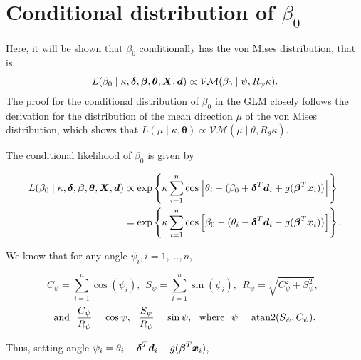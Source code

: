 
\section{Conditional distribution of $\beta_0$} \label{beta0}

Here, it will be shown that $\beta_0$ conditionally has the von Mises distribution, that is
\begin{equation}
L(\beta_0 \mid \kappa, \boldsymbol{\delta}, \boldsymbol{\beta}, \boldsymbol{\theta}, \boldsymbol{X}, \boldsymbol{d})  \propto \mathcal{VM}(\beta_0 \mid \bar\psi, R_{\psi}\kappa).
\end{equation} %
The proof for the conditional distribution of $\beta_0$ in the GLM closely follows the derivation for the distribution of the mean direction $\mu$ of the von Mises distribution, which shows that $L(\mu \mid \kappa, \boldsymbol\theta) \propto \mathcal{VM}(\mu \mid \bar\theta, R_{\theta} \kappa)$.

The conditional likelihood of $\beta_0$ is given by

\begin{align*}
L(\beta_0 \mid \kappa, \boldsymbol{\delta}, \boldsymbol{\beta}, \boldsymbol{\theta}, \boldsymbol{X}, \boldsymbol{d}) & \propto \exp \left\lbrace \kappa \sum_{i=1}^n \cos \left[ \theta_i - (\beta_0 + \boldsymbol{\delta}^T \boldsymbol{d}_i +  g(\boldsymbol\beta^T \boldsymbol{x}_i)) \right] \right\rbrace \\
& = \exp \left\lbrace \kappa \sum_{i=1}^n \cos \left[ \beta_0 - (\theta_i - \boldsymbol{\delta}^T \boldsymbol{d}_i - g(\boldsymbol\beta^T \boldsymbol{x}_i)) \right]  \right\rbrace.
\end{align*}

We know that for any angle $\psi_i, i = 1, \dots, n$,

\begin{equation*}
 C_{\psi} = \sum_{i=1}^n \cos(\psi_i), ~~ S_{\psi} = \sum_{i=1}^n \sin(\psi_i), ~~ R_{\psi} = \sqrt{C_{\psi}^2 + S_{\psi}^2}, ~~
\end{equation*}
\begin{equation*}
 \text{and} ~~ \frac{C_{\psi}}{R_{\psi}} = \cos \bar\psi, ~~ \frac{S_{\psi}}{R_{\psi}} = \sin \bar\psi, ~~ \text{where} ~~ \bar\psi = \operatorname{atan2}(S_{\psi}, C_{\psi}).
\end{equation*}

Thus, setting angle $\psi_i = \theta_i - \boldsymbol{\delta}^T \boldsymbol{d}_i - g(\boldsymbol\beta^T \boldsymbol{x}_i)$,


